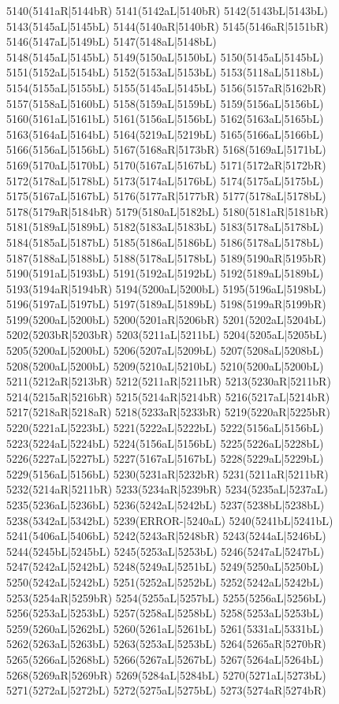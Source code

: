 5140(5141aR|5144bR) 5141(5142aL|5140bR) 5142(5143bL|5143bL) 5143(5145aL|5145bL) 5144(5140aR|5140bR) 5145(5146aR|5151bR) 5146(5147aL|5149bL) 5147(5148aL|5148bL) \\5148(5145aL|5145bL) 5149(5150aL|5150bL) 5150(5145aL|5145bL) 5151(5152aL|5154bL) 5152(5153aL|5153bL) 5153(5118aL|5118bL) 5154(5155aL|5155bL) 5155(5145aL|5145bL) 5156(5157aR|5162bR) \\5157(5158aL|5160bL) 5158(5159aL|5159bL) 5159(5156aL|5156bL) 5160(5161aL|5161bL) 5161(5156aL|5156bL) 5162(5163aL|5165bL) 5163(5164aL|5164bL) 5164(5219aL|5219bL) 5165(5166aL|5166bL) \\5166(5156aL|5156bL) 5167(5168aR|5173bR) 5168(5169aL|5171bL) 5169(5170aL|5170bL) 5170(5167aL|5167bL) 5171(5172aR|5172bR) 5172(5178aL|5178bL) 5173(5174aL|5176bL) 5174(5175aL|5175bL) \\5175(5167aL|5167bL) 5176(5177aR|5177bR) 5177(5178aL|5178bL) 5178(5179aR|5184bR) 5179(5180aL|5182bL) 5180(5181aR|5181bR) 5181(5189aL|5189bL) 5182(5183aL|5183bL) 5183(5178aL|5178bL) \\5184(5185aL|5187bL) 5185(5186aL|5186bL) 5186(5178aL|5178bL) 5187(5188aL|5188bL) 5188(5178aL|5178bL) 5189(5190aR|5195bR) 5190(5191aL|5193bL) 5191(5192aL|5192bL) 5192(5189aL|5189bL) \\5193(5194aR|5194bR) 5194(5200aL|5200bL) 5195(5196aL|5198bL) 5196(5197aL|5197bL) 5197(5189aL|5189bL) 5198(5199aR|5199bR) 5199(5200aL|5200bL) 5200(5201aR|5206bR) 5201(5202aL|5204bL) \\5202(5203bR|5203bR) 5203(5211aL|5211bL) 5204(5205aL|5205bL) 5205(5200aL|5200bL) 5206(5207aL|5209bL) 5207(5208aL|5208bL) 5208(5200aL|5200bL) 5209(5210aL|5210bL) 5210(5200aL|5200bL) \\5211(5212aR|5213bR) 5212(5211aR|5211bR) 5213(5230aR|5211bR) 5214(5215aR|5216bR) 5215(5214aR|5214bR) 5216(5217aL|5214bR) 5217(5218aR|5218aR) 5218(5233aR|5233bR) 5219(5220aR|5225bR) \\5220(5221aL|5223bL) 5221(5222aL|5222bL) 5222(5156aL|5156bL) 5223(5224aL|5224bL) 5224(5156aL|5156bL) 5225(5226aL|5228bL) 5226(5227aL|5227bL) 5227(5167aL|5167bL) 5228(5229aL|5229bL) \\5229(5156aL|5156bL) 5230(5231aR|5232bR) 5231(5211aR|5211bR) 5232(5214aR|5211bR) 5233(5234aR|5239bR) 5234(5235aL|5237aL) 5235(5236aL|5236bL) 5236(5242aL|5242bL) 5237(5238bL|5238bL) \\5238(5342aL|5342bL) 5239(ERROR-|5240aL) 5240(5241bL|5241bL) 5241(5406aL|5406bL) 5242(5243aR|5248bR) 5243(5244aL|5246bL) 5244(5245bL|5245bL) 5245(5253aL|5253bL) 5246(5247aL|5247bL) \\5247(5242aL|5242bL) 5248(5249aL|5251bL) 5249(5250aL|5250bL) 5250(5242aL|5242bL) 5251(5252aL|5252bL) 5252(5242aL|5242bL) 5253(5254aR|5259bR) 5254(5255aL|5257bL) 5255(5256aL|5256bL) \\5256(5253aL|5253bL) 5257(5258aL|5258bL) 5258(5253aL|5253bL) 5259(5260aL|5262bL) 5260(5261aL|5261bL) 5261(5331aL|5331bL) 5262(5263aL|5263bL) 5263(5253aL|5253bL) 5264(5265aR|5270bR) \\5265(5266aL|5268bL) 5266(5267aL|5267bL) 5267(5264aL|5264bL) 5268(5269aR|5269bR) 5269(5284aL|5284bL) 5270(5271aL|5273bL) 5271(5272aL|5272bL) 5272(5275aL|5275bL) 5273(5274aR|5274bR) 